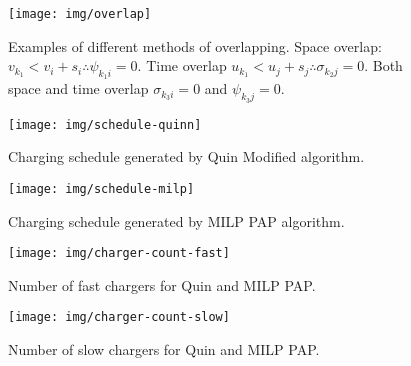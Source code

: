 \documentclass[utf8]{FrontiersinHarvard}
\begin{document}
\begin{figure}[htpb]
\centering
    \texttt{[image: img/overlap]}
    \caption{Examples of different methods of overlapping. Space overlap: $v_{k_1} < v_{i} + s_i \therefore \psi_{k_{1}i} = 0$.
             Time overlap $u_{k_1} < u_{j} + s_j \therefore \sigma_{k_{2}j} = 0$. Both space and time overlap $\sigma_{k_{3}i} = 0$ and
             $\psi_{k_{3}j} = 0$.}
    \label{fig:multipleassign}
\end{figure}

\begin{subfigures}
    \begin{figure}[htpb]
    \centering
        \texttt{[image: img/schedule-quinn]}
        \caption{Charging schedule generated by Quin Modified algorithm.}
        \label{subfig:quin-schedule}
    \end{figure}

    \hfill

    \begin{figure}[htpb]
    \centering
        \texttt{[image: img/schedule-milp]}
        \caption{Charging schedule generated by MILP PAP algorithm.}
        \label{subfig:milp-schedule}
    \end{figure}
\end{subfigures}

\begin{subfigures}
    \begin{figure}[htpb]
    \centering
        \texttt{[image: img/charger-count-fast]}
        \caption{Number of fast chargers for Quin and MILP PAP.}
        \label{subfig:fast-charger-usage}
    \end{figure}

    \hfill

    \begin{figure}[!ht]
    \centering
        \texttt{[image: img/charger-count-slow]}
        \caption{Number of slow chargers for Quin and MILP PAP.}
        \label{subfig:slow-charger-usage}
    \end{figure}
\end{subfigures}
\end{document}
